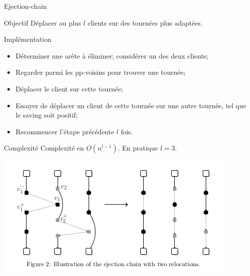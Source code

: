 \documentclass{beamer}
\begin{document}
\begin{frame}{Ejection-chain}

\begin{block}{Objectif}
Déplacer au plus $l$ clients sur des tournées plus adaptées. 
\end{block}

\begin{exampleblock}{Implémentation}
\begin{itemize}
\item Déterminer une arête à éliminer; considérer un des deux clients;
\item Regarder parmi les pp-voisins pour trouver une tournée;
\item Déplacer le client sur cette tournée;
\item Essayer de déplacer un client de cette tournée sur une autre tournée, tel que le saving soit positif;
\item Recommencer l'étape précédente $l$ fois.
\end{itemize}
\end{exampleblock}

\end{frame}

\begin{frame}

\begin{alertblock}{Complexité}
Complexité en $O(n^{l-1})$. En pratique $l=3$. 
\end{alertblock}

	\centering
	\includegraphics[height=0.4\textheight]{ejection_chain.png}
\end{frame}
\end{document}
